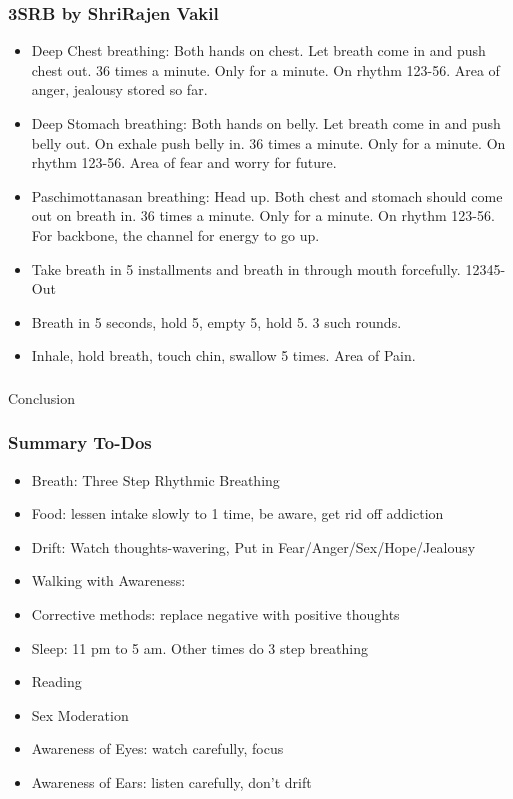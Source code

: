 \begin{frame}[fragile]
\frametitle{3SRB by ShriRajen Vakil}


\begin{itemize}
\item Deep Chest breathing: Both hands on chest. Let breath come in and push chest out. 36 times a minute. Only for a minute. On rhythm 123-56. Area of anger, jealousy stored so far.
\item Deep Stomach breathing: Both hands on belly. Let breath come in and push belly out. On exhale push belly in. 36 times a minute. Only for a minute. On rhythm 123-56. Area of fear and worry for future.
\item Paschimottanasan breathing: Head up. Both chest and stomach should come out on breath in. 36 times a minute. Only for a minute. On rhythm 123-56. For backbone, the channel for energy to go up.
\item Take breath in 5 installments and breath in through mouth forcefully. 12345-Out
\item Breath in 5 seconds, hold 5, empty 5, hold 5. 3 such rounds.
\item Inhale, hold breath, touch chin, swallow 5 times. Area of Pain.

\end{itemize}
\end{frame}

\begin{frame}[fragile]\frametitle{}
\begin{center}
{\Large Conclusion}
\end{center}
\end{frame}



\begin{frame}[fragile]
\frametitle{Summary To-Dos}
\begin{itemize}
\item Breath: Three Step Rhythmic Breathing
\item Food: lessen intake slowly to 1 time, be aware, get rid off addiction
\item Drift: Watch thoughts-wavering, Put in Fear/Anger/Sex/Hope/Jealousy
\item Walking with Awareness: 
\item Corrective methods: replace negative with positive thoughts
\item Sleep: 11 pm to 5 am. Other times do 3 step breathing
\item Reading
\item Sex Moderation
\item Awareness of Eyes: watch carefully, focus
\item Awareness of Ears: listen carefully, don't drift
\end{itemize}
\end{frame}